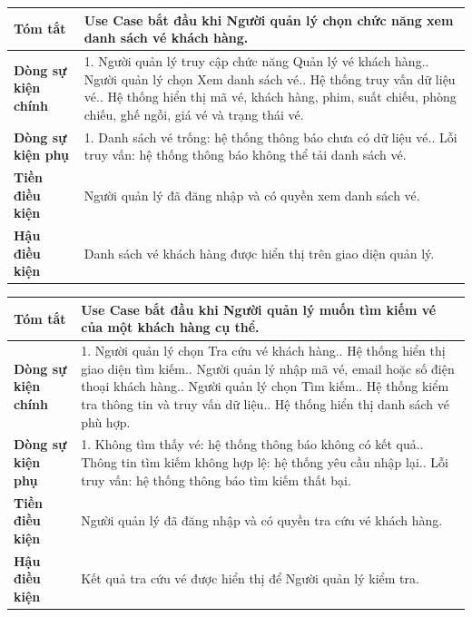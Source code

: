 \begin{longtable}{|p{4.2cm}|p{11.3cm}|}
\hline
\rowcolor{headerblue} \textbf{Tóm tắt} & \textbf{Use Case bắt đầu khi Người quản lý chọn chức năng xem danh sách vé khách hàng.} \\ \hline
\endhead
\textbf{Dòng sự kiện chính} & 1. Người quản lý truy cập chức năng Quản lý vé khách hàng.\newline 2. Người quản lý chọn Xem danh sách vé.\newline 3. Hệ thống truy vấn dữ liệu vé.\newline 4. Hệ thống hiển thị mã vé, khách hàng, phim, suất chiếu, phòng chiếu, ghế ngồi, giá vé và trạng thái vé. \\ \hline
\textbf{Dòng sự kiện phụ} & 1. Danh sách vé trống: hệ thống thông báo chưa có dữ liệu vé.\newline 2. Lỗi truy vấn: hệ thống thông báo không thể tải danh sách vé. \\ \hline
\textbf{Tiền điều kiện} & Người quản lý đã đăng nhập và có quyền xem danh sách vé. \\ \hline
\textbf{Hậu điều kiện} & Danh sách vé khách hàng được hiển thị trên giao diện quản lý. \\ \hline
\end{longtable}

\begin{longtable}{|p{4.2cm}|p{11.3cm}|}
\hline
\rowcolor{headerblue} \textbf{Tóm tắt} & \textbf{Use Case bắt đầu khi Người quản lý muốn tìm kiếm vé của một khách hàng cụ thể.} \\ \hline
\endhead
\textbf{Dòng sự kiện chính} & 1. Người quản lý chọn Tra cứu vé khách hàng.\newline 2. Hệ thống hiển thị giao diện tìm kiếm.\newline 3. Người quản lý nhập mã vé, email hoặc số điện thoại khách hàng.\newline 4. Người quản lý chọn Tìm kiếm.\newline 5. Hệ thống kiểm tra thông tin và truy vấn dữ liệu.\newline 6. Hệ thống hiển thị danh sách vé phù hợp. \\ \hline
\textbf{Dòng sự kiện phụ} & 1. Không tìm thấy vé: hệ thống thông báo không có kết quả.\newline 2. Thông tin tìm kiếm không hợp lệ: hệ thống yêu cầu nhập lại.\newline 3. Lỗi truy vấn: hệ thống thông báo tìm kiếm thất bại. \\ \hline
\textbf{Tiền điều kiện} & Người quản lý đã đăng nhập và có quyền tra cứu vé khách hàng. \\ \hline
\textbf{Hậu điều kiện} & Kết quả tra cứu vé được hiển thị để Người quản lý kiểm tra. \\ \hline
\end{longtable}

